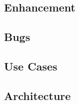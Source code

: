 \subsection{Enhancement}
\label{sec:enhancement}


\subsection{Bugs}
\label{sec:bugs}


\subsection{Use Cases}
\label{sec:use-cases}


\subsection{Architecture}
\label{sec:architecture}


